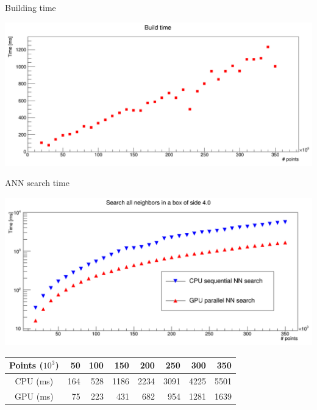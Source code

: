 \documentclass{beamer}
\newenvironment{changemargin}[2]{%
  \begin{list}{}{%
    \setlength{\topsep}{0pt}%
    \setlength{\leftmargin}{#1}%
    \setlength{\rightmargin}{#2}%
    \setlength{\listparindent}{\parindent}%
    \setlength{\itemindent}{\parindent}%
    \setlength{\parsep}{\parskip}%
  }%
  \item[]}{\end{list}}
\begin{document}
\begin{frame}{Building time}
\begin{center}
\begin{changemargin}{-5mm}{-5mm}
\includegraphics[scale=0.25]{images/volumeBuildTime.png}
\end{changemargin}
\end{center}
\end{frame}

\begin{frame}{ANN search time}
\begin{center}
\begin{changemargin}{-5mm}{-5mm}
\includegraphics[scale=0.28]{images/volumeKdTree.png}
\end{changemargin}

\begin{table}[h]
\begin{tabular}{ c || r r r r r r r }
Points ($10^{3}$) & 50 & 100 & 150 & 200 & 250 & 300 & 350 \\
\hline
CPU (ms) & 164 & 528 & 1186 & 2234 & 3091 & 4225 & 5501 \\
GPU (ms) & 75 & 223 & 431 & 682 & 954 & 1281 & 1639 \\
\end{tabular}
\end{table}
\end{center}
\end{frame}
\end{document}
